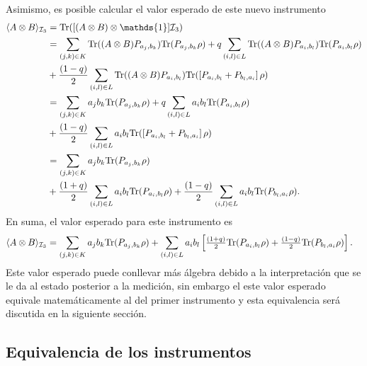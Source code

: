 Asimismo, es posible calcular el valor esperado de este nuevo instrumento \begin{equation*}
    \begin{split}
        \la A\otimes B \ra_{\mathcal{I}_3}&=\tr([(A\otimes B) \otimes \mathds{1}]\mathcal{I}_3)\\
        &=\sum_{(j,k)\in K} \tr((A\otimes B )P_{a_j,b_k})\tr(P_{a_j,b_k}\rho)+q\sum_{(i,l)\in L}\tr((A\otimes B)P_{a_i,b_l}) \tr(P_{a_i,b_l}\rho)\\
        &+\dfrac{(1-q)}{2}\sum_{(i,l) \in L}\tr((A\otimes B )P_{a_i,b_l}) \tr(\left[P_{a_i,b_l}+P_{b_l,a_i}\right]\rho)\\
        &=\sum_{(j,k)\in K} a_j b_k\tr(P_{a_j,b_k}\rho)+q\sum_{(i,l)\in L}a_i b_l \tr(P_{a_i,b_l}\rho)\\
        &+\dfrac{(1-q)}{2}\sum_{(i,l) \in L} a_i b_l\tr(\left[P_{a_i,b_l}+P_{b_l,a_i}\right]\rho)\\
        &=\sum_{(j,k)\in K} a_j b_k \tr(P_{a_j, b_k}\rho)\\
        &+\dfrac{(1+q)}{2}\sum_{(i,l)\in L}a_i b_l \tr(P_{a_i,b_l}\rho) +\dfrac{(1-q)}{2}\sum_{(i,l) \in L}a_i b_l \tr(P_{b_l, a_i}\rho).
    \end{split}
\end{equation*}En suma, el valor esperado para este instrumento es \begin{equation}\label{eq:expectedValueThirdInstrument2p}
    \begin{split}
        \langle A\otimes B \rangle_{\mathcal{I}_3}&=\sum_{(j,k)\in K} a_j b_k {\rm Tr}(P_{a_j, b_k}\rho)+\sum_{(i,l)\in L}a_i b_l \left[\tfrac{(1+q)}{2} {\rm Tr}(P_{a_i,b_l}\rho) +\tfrac{(1-q)}{2}{\rm Tr}(P_{b_l, a_i}\rho)\right].
    \end{split}
\end{equation} Este valor esperado puede conllevar más álgebra debido a la interpretación que se le da al estado posterior a la medición, sin embargo el  este valor esperado equivale matemáticamente al del primer instrumento y esta equivalencia será discutida en la siguiente sección. 






\subsection{Equivalencia de los instrumentos}\label{subsec:Equivalencia } %

